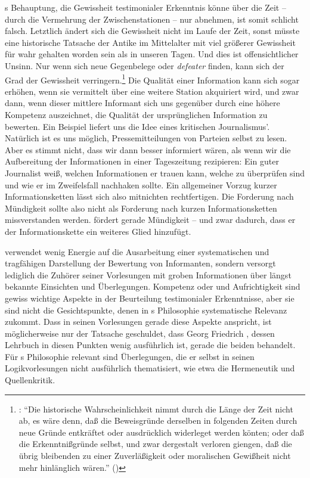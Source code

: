 s Behauptung, die Gewissheit testimonialer
Erkenntnis könne über die Zeit -- durch die Vermehrung der Zwischenstationen -- nur abnehmen, ist
somit schlicht falsch. Letztlich ändert sich die Gewissheit nicht im Laufe der
Zeit, sonst müsste eine historische Tatsache der Antike im Mittelalter mit viel
größerer Gewissheit für wahr gehalten worden sein als in unseren Tagen. Und dies ist
offensichtlicher Unsinn. Nur wenn sich neue Gegenbelege oder \emph{defeater}
finden, kann sich der Grad der Gewissheit
verringern.\footnote{\cite[Vgl.][\S~626]{Crusius:WegzurGewissheitundZuverlaessigkeitdermenschlichenErkenntniss1965}:
\enquote{Die historische Wahrscheinlichkeit nimmt durch die Länge der Zeit nicht
ab, es wäre denn, daß die Beweisgründe derselben in folgenden Zeiten durch neue
Gründe entkräftet oder ausdrücklich widerleget werden könten; oder daß die
Erkenntnißgründe selbst, und zwar dergestalt verloren giengen, daß die übrig
bleibenden zu einer Zuverläßigkeit oder moralischen Gewißheit nicht mehr
hinlänglich wären.} (\ohio)} Die Qualität einer Information
kann sich sogar erhöhen, wenn sie vermittelt über eine weitere Station
akquiriert wird, und zwar dann, wenn dieser mittlere Informant sich uns gegenüber durch eine höhere
Kompetenz auszeichnet, die Qualität der ursprünglichen Information zu bewerten. Ein
Beispiel liefert uns die Idee eines kritischen Journalismus'. Natürlich
ist es uns möglich, Pressemitteilungen von Parteien selbst zu lesen. Aber es stimmt nicht, dass wir
dann besser informiert wären, als wenn wir die Aufbereitung der Informationen in
einer Tageszeitung rezipieren: Ein guter Journalist weiß, welchen Informationen
er trauen kann, welche zu überprüfen sind und wie er im Zweifelsfall nachhaken
sollte. Ein allgemeiner Vorzug kurzer Informationsketten lässt sich also
mitnichten rechtfertigen. Die Forderung nach Mündigkeit sollte also nicht als
Forderung nach kurzen Informationsketten missverstanden werden.
 fördert gerade Mündigkeit -- und zwar
dadurch, dass er der Informationskette ein weiteres Glied hinzufügt.

 verwendet wenig Energie auf die Ausarbeitung einer
systematischen und tragfähigen Darstellung der Bewertung von Informanten,
sondern versorgt lediglich die Zuhörer seiner Vorlesungen mit groben
Informationen über längst bekannte Einsichten und Überlegungen. Kompetenz oder
 und Aufrichtigkeit sind gewiss wichtige Aspekte in der
Beurteilung testimonialer Erkenntnisse, aber sie sind nicht die Gesichtspunkte,
denen in s Philosophie systematische Relevanz zukommt. Dass
 in seinen Vorlesungen gerade diese Aspekte anspricht, ist
möglicherweise nur der Tatsache geschuldet, dass Georg Friedrich
, dessen Lehrbuch in diesen Punkten wenig ausführlich ist, gerade
die beiden behandelt. Für s Philosophie relevant
sind Überlegungen, die er selbst in seinen Logikvorlesungen nicht ausführlich
thematisiert, wie etwa die Hermeneutik und Quellenkritik.



